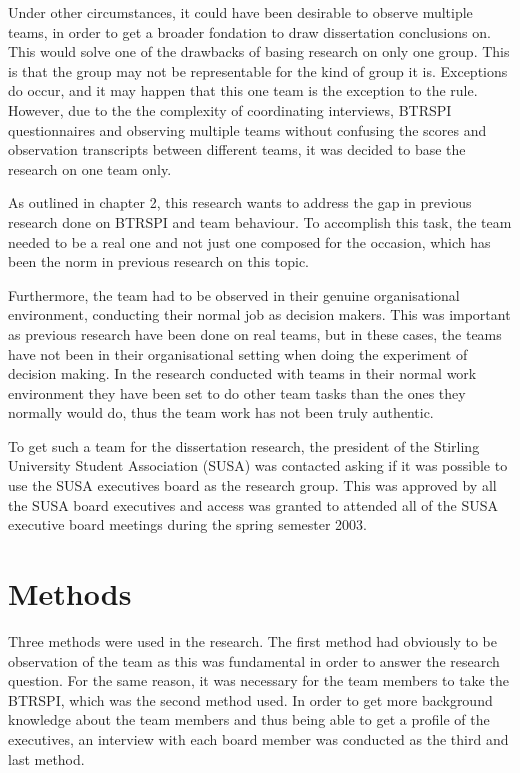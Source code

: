 \documentclass[a4paper,12pt,titlepage]{report}
\begin{document}
  Under other circumstances, it could have been desirable to observe
  multiple teams, in order to get a broader
  fondation to draw dissertation conclusions on. This would solve
  one of the drawbacks of basing research
  on only one group. This is that the group may not be representable for
  the kind of group it is. Exceptions do occur, and it may happen that
  this one team is the exception to the rule. However, due to the 
  the complexity of coordinating interviews, BTRSPI questionnaires and observing
  multiple teams without confusing the scores and observation transcripts
  between different teams, it was decided to base the research on one team
  only.

  As outlined in chapter 2, this research wants to address the
  gap in previous research done on BTRSPI and team behaviour.
  To accomplish this task, the team needed to be a real one and not
  just one composed for the occasion, which has been the norm
  in previous research on this topic.

  Furthermore, the team
  had to be observed in their genuine organisational environment,
  conducting their normal job as decision makers.
  This was important as previous research have
  been done on real teams, but in these cases, the teams have not been in their
  organisational setting when doing the experiment of decision making.
  In the research conducted with teams in their normal work environment
  they have been set to do other team tasks than the ones they normally would do,
  thus the team work has not been truly authentic.

  To get such a team for the dissertation research,
  the president of the Stirling University Student Association (SUSA) was
  contacted asking if it was possible to use the SUSA executives board as
  the research group. This was approved by all the SUSA board
  executives and access was granted to attended all of the SUSA executive
  board meetings during the spring semester 2003.

  \section{Methods}
  Three methods were used in the research. The first method had obviously to
  be observation of the team as this was fundamental in order to answer
  the research question. For the same reason, it was necessary for
  the team members to take the BTRSPI, which was the second
  method used. In order to get more background
  knowledge about the team members and thus being able to get
  a profile of the executives, an interview with each board member
  was conducted as the third and last method.
\end{document}
